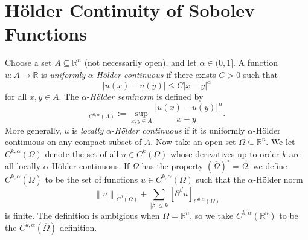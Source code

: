 \documentclass{book}
\newcommand{\bbR}{\mathbb{R}}
\newcommand{\abs}[1]{\left\lvert {#1} \right\rvert}
\newcommand{\norm}[1]{\left\lVert {#1} \right\rVert}
\theoremstyle{definition}
\numberwithin{equation}{chapter}
\begin{document}
\section{H\"older Continuity of Sobolev Functions}

Choose a set $A \subseteq \bbR^n$ (not necessarily open), and let $\alpha \in (0,1]$. A function $u \colon A \to \bbR$ is \textit{uniformly} $\alpha$-\textit{H\"older continuous} if there exists $C > 0$ such that
\begin{equation}
    \abs{u(x) - u(y)} \leq C \abs{x - y}^\alpha 
\end{equation}
for all $x,y \in A$. The $\alpha$-\textit{H\"older seminorm} is defined by 
\begin{equation}
    [u]_{C^{0,\alpha}(A)} := \sup_{x,y \in A} \frac{\abs{u(x) - u(y)}}{x - y}^\alpha.
\end{equation}
More generally, $u$ is \textit{locally} $\alpha$-\textit{H\"older continuous} if it is uniformly $\alpha$-H\"older continuous on any compact subset of $A$. Now take an open set $\Omega \subseteq \bbR^n$. We let $C^{k,\alpha}(\Omega)$ denote the set of all $u \in C^k(\Omega)$ whose derivatives up to order $k$ are all locally $\alpha$-H\"older continuous. If $\Omega$ has the property $(\overline{\Omega})^\circ = \Omega$, we define $C^{k,\alpha}(\overline{\Omega})$ to be the set of functions $u \in C^{k,\alpha}(\Omega)$ such that the $\alpha$-H\"older norm 
\begin{equation}
    \norm{u}_{C^0(\Omega)} + \sum_{\abs{\beta} \leq k} [\partial^\beta u]_{C^{0,\alpha}(\Omega)}
\end{equation}
is finite. The definition is ambigious when $\Omega = \bbR^n$, so we take $C^{k,\alpha}(\bbR^n)$ to be the $C^{k,\alpha}(\overline{\Omega})$ definition.
\end{document}
